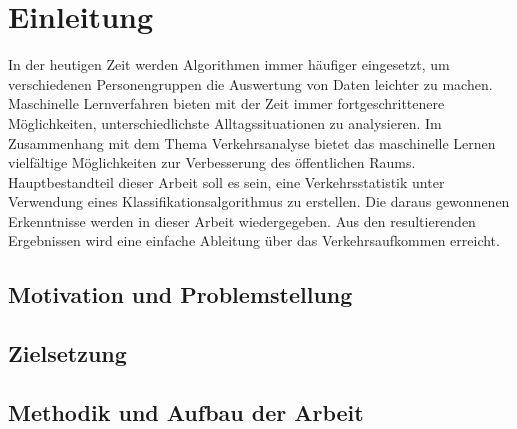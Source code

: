 
\chapter{Einleitung}

In der heutigen Zeit werden Algorithmen immer häufiger eingesetzt, um verschiedenen Personengruppen die Auswertung von Daten leichter zu machen. Maschinelle Lernverfahren bieten mit der Zeit immer fortgeschrittenere Möglichkeiten, unterschiedlichste Alltagssituationen zu analysieren. Im Zusammenhang mit dem Thema Verkehrsanalyse bietet das maschinelle Lernen vielfältige Möglichkeiten zur Verbesserung des öffentlichen Raums. Hauptbestandteil dieser Arbeit soll es sein, eine Verkehrsstatistik unter Verwendung eines Klassifikationsalgorithmus zu erstellen. Die daraus gewonnenen Erkenntnisse werden in dieser Arbeit wiedergegeben. Aus den resultierenden Ergebnissen wird eine einfache Ableitung über das Verkehrsaufkommen erreicht. 

\section{Motivation und Problemstellung}

\section{Zielsetzung}

\section{Methodik und Aufbau der Arbeit}